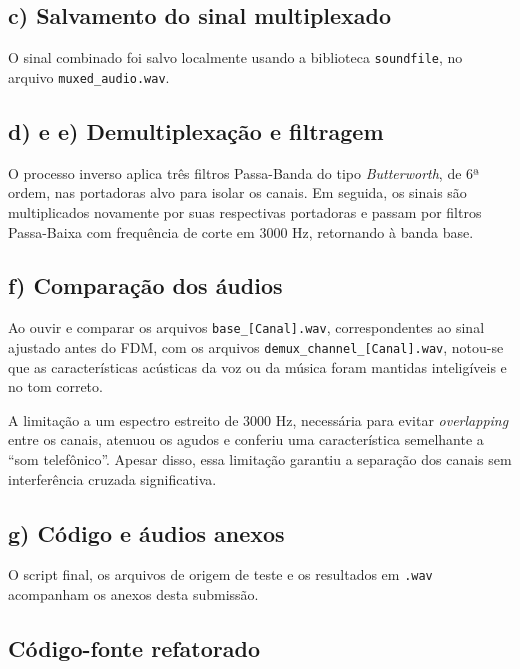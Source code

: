 \documentclass[12pt,a4paper]{article}
\begin{document}
\subsection*{c) Salvamento do sinal multiplexado}

O sinal combinado foi salvo localmente usando a biblioteca \texttt{soundfile}, no arquivo \texttt{muxed\_audio.wav}.

\subsection*{d) e e) Demultiplexação e filtragem}

O processo inverso aplica três filtros Passa-Banda do tipo \textit{Butterworth}, de 6ª ordem, nas portadoras alvo para isolar os canais. Em seguida, os sinais são multiplicados novamente por suas respectivas portadoras e passam por filtros Passa-Baixa com frequência de corte em $3000$ Hz, retornando à banda base.

\subsection*{f) Comparação dos áudios}

Ao ouvir e comparar os arquivos \texttt{base\_[Canal].wav}, correspondentes ao sinal ajustado antes do FDM, com os arquivos \texttt{demux\_channel\_[Canal].wav}, notou-se que as características acústicas da voz ou da música foram mantidas inteligíveis e no tom correto.

A limitação a um espectro estreito de $3000$ Hz, necessária para evitar \textit{overlapping} entre os canais, atenuou os agudos e conferiu uma característica semelhante a ``som telefônico''. Apesar disso, essa limitação garantiu a separação dos canais sem interferência cruzada significativa.

\subsection*{g) Código e áudios anexos}

O script final, os arquivos de origem de teste e os resultados em \texttt{.wav} acompanham os anexos desta submissão.

\subsection*{Código-fonte refatorado}
\end{document}
